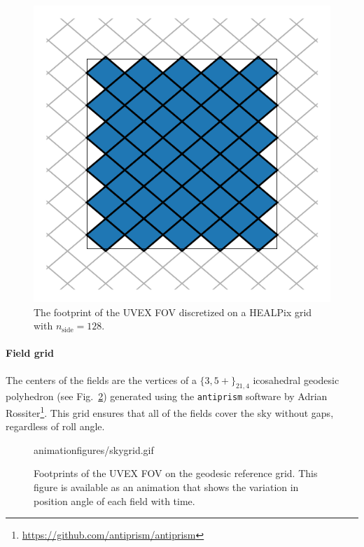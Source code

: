 \documentclass[twocolumn,times]{aastex631}
\begin{document}
\begin{figure}
    \includegraphics[width=\columnwidth]{figures/fov}
    \caption{\label{fig:fov}The footprint of the \ac{UVEX} \ac{FOV} discretized on a \ac{HEALPix} grid with $n_\mathrm{side} = 128$.}
\end{figure}

\paragraph{Field grid}
The centers of the fields are the vertices of a $\{3,5+\}_{21,4}$ icosahedral geodesic polyhedron (see Fig.~\ref{fig:skygrid}) generated using the \texttt{antiprism} software by Adrian Rossiter\footnote{\url{https://github.com/antiprism/antiprism}}. This grid ensures that all of the fields cover the sky without gaps, regardless of roll angle.

\begin{figure}
    \begin{interactive}{animation}{figures/skygrid.gif}
    \end{interactive}
    \caption{\label{fig:skygrid}Footprints of the \ac{UVEX} \ac{FOV} on the geodesic reference grid. This figure is available as an animation that shows the variation in position angle of each field with time.}
\end{figure}
\end{document}
